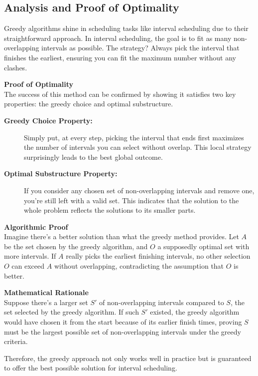 \documentclass[12pt]{book} %
\begin{document}
\subsection{Analysis and Proof of Optimality}

Greedy algorithms shine in scheduling tasks like interval scheduling due to their straightforward approach. In interval scheduling, the goal is to fit as many non-overlapping intervals as possible. The strategy? Always pick the interval that finishes the earliest, ensuring you can fit the maximum number without any clashes.

\textbf{Proof of Optimality}\\
\FloatBarrier
The success of this method can be confirmed by showing it satisfies two key properties: the greedy choice and optimal substructure.

\begin{description}
    \item[\textbf{Greedy Choice Property:}] Simply put, at every step, picking the interval that ends first maximizes the number of intervals you can select without overlap. This local strategy surprisingly leads to the best global outcome.

    \item[\textbf{Optimal Substructure Property:}] If you consider any chosen set of non-overlapping intervals and remove one, you're still left with a valid set. This indicates that the solution to the whole problem reflects the solutions to its smaller parts.
\end{description}

\textbf{Algorithmic Proof}\\
Imagine there’s a better solution than what the greedy method provides. Let \( A \) be the set chosen by the greedy algorithm, and \( O \) a supposedly optimal set with more intervals. If \( A \) really picks the earliest finishing intervals, no other selection \( O \) can exceed \( A \) without overlapping, contradicting the assumption that \( O \) is better.

\textbf{Mathematical Rationale}\\
Suppose there’s a larger set \( S' \) of non-overlapping intervals compared to \( S \), the set selected by the greedy algorithm. If such \( S' \) existed, the greedy algorithm would have chosen it from the start because of its earlier finish times, proving \( S \) must be the largest possible set of non-overlapping intervals under the greedy criteria.

Therefore, the greedy approach not only works well in practice but is guaranteed to offer the best possible solution for interval scheduling.
\end{document}
